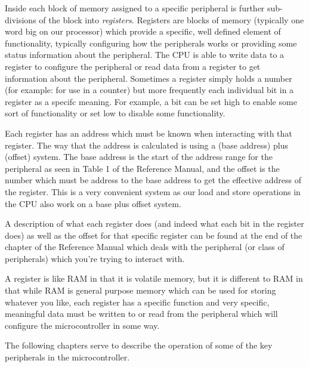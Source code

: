Inside each block of memory assigned to a specific peripheral is further sub-divisions of the block into \emph{registers}. Registers are blocks of memory (typically one word big on our processor) which provide a specific, well defined element of functionality, typically configuring how the peripherals works or providing some status information about the peripheral. The CPU is able to write data to a register to configure the peripheral or read data from a register to get information about the peripheral. Sometimes a register simply holds a number (for example: for use in a counter) but more frequently each individual bit in a register as a specifc meaning. For example, a bit can be set high to enable some sort of functionality or set low to disable some functionality. 

Each register has an address which must be known when interacting with that register. The way that the address is calculated is using a (base address) plus (offset) system. The base address is the start of the address range for the peripheral as seen in Table 1 of the Reference Manual, and the offset is the number which must be address to the base address to get the effective address of the register. This is a very convenient system as our load and store operations in the CPU also work on a base plus offset system. 

A description of what each register does (and indeed what each bit in the register does) as well as the offset for that specific register can be found at the end of the chapter of the Reference Manual which deals with the peripheral (or class of peripherals) which you're trying to interact with. 

A register is like RAM in that it is volatile memory, but it is different to RAM in that while RAM is general purpose memory which can be used for storing whatever you like, each register has a specific function and very specific, meaningful data must be written to or read from the peripheral which will configure the microcontroller in some way.

The following chapters serve to describe the operation of some of the key peripherals in the microcontroller.

